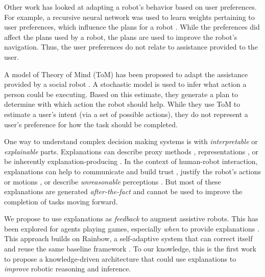 \documentclass[letterpaper]{article} %
\begin{document}
Other work has looked at adapting a robot's behavior based on user preferences.
For example, a recursive neural network was used
to learn weights pertaining to user preferences, which influence the plans for
a robot \cite{Bacciu2014}.  While the preferences did affect the plans used by a robot, 
the plans are used to improve the 
robot's navigation.  Thus, the user preferences do not relate to assistance 
provided to the user.

A model of Theory of Mind (ToM) has been proposed to adapt the assistance provided
by a social robot \cite{Gorur2017}.  A stochastic model is used to infer what action a person could 
be executing.  Based on this estimate, they generate a plan to determine with which 
action the robot should help. 
While they use ToM to estimate a user's intent (via a set of possible actions), 
they do not represent a user's preference for how the task should be completed.

  
One way to understand complex decision making systems is with
\emph{interpretable} or \emph{explainable} parts.  Explanations can describe
proxy methods \cite{why-trust,grad-cam,visualizing}, representations
\cite{netdissect2017,cavs}, or be inherently explanation-producing
\cite{multimodal}.  
In the context
of human-robot interaction, explanations can help to communicate and
build trust \cite{wang2016trust}, justify the robot's actions
\cite{stange2020effects} or motions \cite{dragan2013legibility}, or
describe \emph{unreasonable} perceptions \cite{gilpin-hri}.  But most of
these explanations are generated \emph{after-the-fact} and cannot be used
to improve the completion of tasks moving forward.  

We propose to use explanations as \emph{feedback} to augment assistive
robots.  This has been explored for agents playing games, especially
\emph{when} to provide explanations \cite{li2020reasoning}.  This approach
builds on Rainbow, a self-adaptive system that can correct itself and
reuse the same baseline framework \cite{rainbow}.  To our knowledge,
this is the first work to propose a knowledge-driven architecture that could use explanations to \emph{improve} robotic reasoning and inference. 
\end{document}
